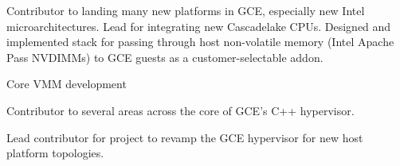 \begin{outerlist}
\begin{outerlist}
\begin{outerlist}
         \item Contributor to landing many new platforms in GCE, especially new
         Intel microarchitectures. Lead for integrating new Cascadelake
	 CPUs. Designed and implemented stack for passing through host
	 non-volatile memory (Intel Apache Pass NVDIMMs) to GCE guests as a
	 customer-selectable addon.
      \end{outerlist}
      \item Core VMM development
      \begin{outerlist}
         \item Contributor to several areas across the core of GCE's C++
         hypervisor.
         \item Lead contributor for project to revamp the GCE hypervisor
         for new host platform topologies.
      \end{outerlist}
   \end{outerlist}
\end{outerlist}

\pagebreak

